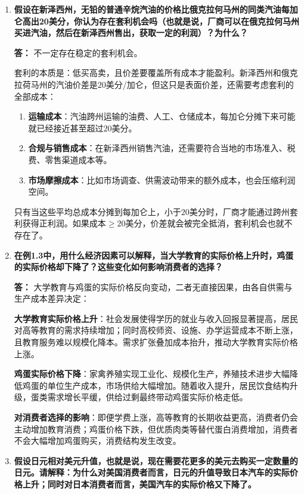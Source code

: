 \begin{enumerate}[label=\textbf{\arabic*.}, leftmargin=*]
		\item \textbf{假设在新泽西州，无铅的普通辛烷汽油的价格比俄克拉何马州的同类汽油每加仑高出20美分，你认为存在套利机会吗（也就是说，厂商可以在俄克拉何马州买进汽油，然后在新泽西州售出，获取一定的利润）？为什么？}
		
		\textbf{答：}
		不一定存在稳定的套利机会。
		
		套利的本质是：低买高卖，且价差要覆盖所有成本才能盈利。新泽西州和俄克拉荷马州的汽油价差是$20$美分/加仑，但这只是表面价差，还需要考虑套利的全部成本：
		\begin{enumerate}
			\item \textbf{运输成本}：汽油跨州运输的油费、人工、仓储成本，每加仑分摊下来可能就已经接近甚至超过$20$美分。
			\item \textbf{合规与销售成本}：在新泽西州销售汽油，还需要符合当地的市场准入、税费、零售渠道成本等。
			\item \textbf{市场摩擦成本}：比如市场调查、供需波动带来的额外成本，也会压缩利润空间。
		\end{enumerate}
		
		只有当这些平均总成本分摊到每加仑上，小于$20$美分时，厂商才能通过跨州套利获得正利润。如果成本$\geq 20$美分，价差就会被完全抵消，套利机会也就不存在了。
		
		\item \textbf{在例1.3中，用什么经济因素可以解释，当大学教育的实际价格上升时，鸡蛋的实际价格却下降了？这些变化如何影响消费者的选择？}
		
		\textbf{答：}
		大学教育与鸡蛋的实际价格反向变动，二者无直接因果，由各自供需与生产成本差异决定：
		
		\textbf{大学教育实际价格上升}：社会发展使得学历的就业与收入回报显著提高，居民对高等教育的需求持续增加；同时高校师资、设施、办学运营成本不断上涨，且教育服务难以规模化降本。需求扩张叠加成本抬升，推动大学教育实际价格上涨。
		
		\textbf{鸡蛋实际价格下降}：家禽养殖实现工业化、规模化生产，养殖技术进步大幅降低鸡蛋的单位生产成本，市场供给大幅增加。随着收入提升，居民饮食结构升级，蛋类需求增长平缓，供给过剩最终带动鸡蛋实际价格走低。
		
		\textbf{对消费者选择的影响}：即便学费上涨，高等教育的长期收益更高，消费者仍会主动增加教育消费；鸡蛋价格下跌，但优质肉类等替代蛋白消费增加，消费者不会大幅增加鸡蛋购买，消费结构发生改变。
		
		\item \textbf{假设日元相对美元升值，也就是说，现在需要花更多的美元去购买一定数量的日元。请解释：为什么对美国消费者而言，日元的升值导致日本汽车的实际价格上升；同时对日本消费者而言，美国汽车的实际价格又下降了。}
		

\end{enumerate}
